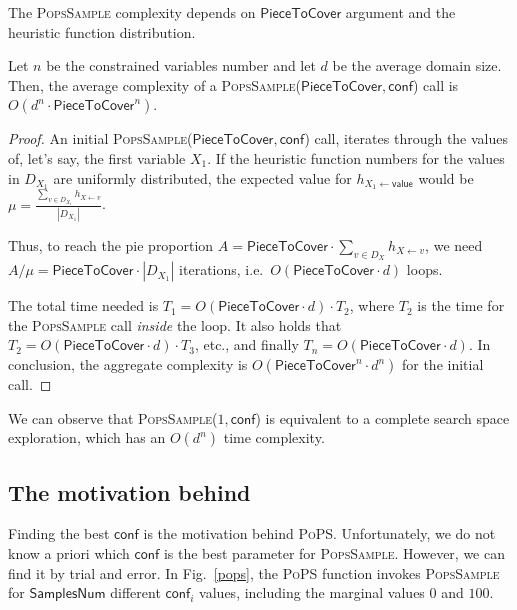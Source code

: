 \documentclass{ws-ijait}
\begin{document}
The \textsc{PopsSample} complexity depends on
$\mathsf{PieceToCover}$ argument and the heuristic function
distribution.
\begin{lemma}
  Let $n$ be the constrained variables number and let $d$ be
  the average domain size. Then, the average complexity of a
  \textsc{PopsSample}($\mathsf{PieceToCover},\mathsf{conf}$)
  call is $O(d^n \cdot \mathsf{PieceToCover}^n)$.
\end{lemma}
\begin{proof}
  An initial
  \textsc{PopsSample}($\mathsf{PieceToCover},\mathsf{conf}$)
  call, iterates through the values of, let's say, the first
  variable $X_1$. If the heuristic function numbers for the
  values in $D_{X_1}$ are uniformly distributed, the
  expected value for $h_{X_1 \gets \mathsf{value}}$ would be
  $\mu = \frac{\sum_{v \in D_{X_1}} h_{X \gets
  v}}{|D_{X_1}|}$.

  Thus, to reach the pie proportion $A =
  \mathsf{PieceToCover} \cdot \sum_{v \in D_X} h_{X \gets
  v}$, we need $A / \mu = \mathsf{PieceToCover} \cdot
  |D_{X_1}|$ iterations, i.e.\ 
  $O(\mathsf{PieceToCover} \cdot d)$ loops.

  The total time needed is $T_1 = O(\mathsf{PieceToCover}
  \cdot d) \cdot T_2$, where $T_2$ is the time for the
  \textsc{PopsSample} call \emph{inside} the loop. It also
  holds that $T_2 = O(\mathsf{PieceToCover} \cdot d) \cdot
  T_3$, etc., and finally $T_n = O(\mathsf{PieceToCover}
  \cdot d)$. In conclusion, the aggregate complexity is
  $O(\mathsf{PieceToCover}^n \cdot d^n)$ for the initial
  call.
\end{proof}
We can observe that \textsc{PopsSample}($1,\mathsf{conf}$)
is equivalent to a complete search space exploration, which
has an $O(d^n)$ time complexity.

\subsection{The motivation behind \PoPS\label{sampling}}

Finding the best $\mathsf{conf}$ is the motivation behind
\textsc{PoPS}. Unfortunately, we do not know a priori which
$\mathsf{conf}$ is the best parameter for
\textsc{PopsSample}. However, we can find it by trial and
error. In Fig.~\ref{pops}, the \textsc{PoPS} function
invokes \textsc{PopsSample} for $\mathsf{SamplesNum}$
different $\mathsf{conf}_i$ values, including the marginal
values $0$ and $100$.
\end{document}
